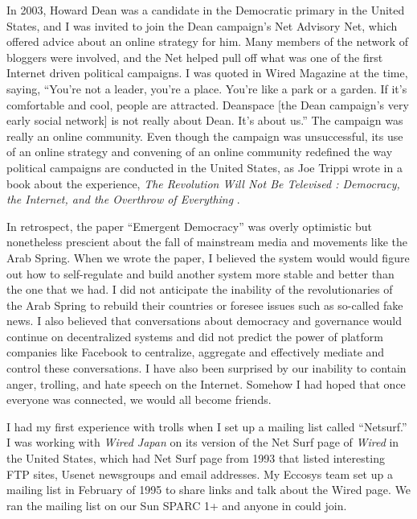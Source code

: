 In 2003, Howard Dean was a candidate in the Democratic primary in the United States, and I was invited to join the Dean campaign's Net Advisory Net, which offered advice about an online strategy for him. Many members of the network of bloggers were involved, and the Net helped pull off what was one of the first Internet driven political campaigns. I was quoted in Wired Magazine \cite{wolf2004internet} at the time, saying, ``You're not a leader, you're a place. You're like a park or a garden. If it's comfortable and cool, people are attracted. Deanspace [the Dean campaign's very early social network] is not really about Dean. It's about us.'' The campaign was really an online community. Even though the campaign was unsuccessful, its use of an online strategy and convening of an online community redefined the way political campaigns are conducted in the United States, as Joe Trippi wrote in a book about the experience, \textit{The Revolution Will Not Be Televised : Democracy, the Internet, and the Overthrow of Everything} \cite{trippi2004revolution}.

In retrospect, the paper ``Emergent Democracy'' was overly optimistic but nonetheless prescient about the fall of mainstream media and movements like the Arab Spring. When we wrote the paper, I believed the system would would figure out how to self-regulate and build another system more stable and better than the one that we had. I did not anticipate the inability of the revolutionaries of the Arab Spring to rebuild their countries or foresee issues such as so-called fake news. I also believed that conversations about democracy and governance would continue on decentralized systems and did not predict the power of platform companies like Facebook to centralize, aggregate and effectively mediate and control these conversations. I have also been surprised by our inability to contain anger, trolling, and hate speech on the Internet. Somehow I had hoped that once everyone was connected, we would all become friends.

I had my first experience with trolls when I set up a mailing list called ``Netsurf.'' I was working with \textit{Wired Japan} on its version of the Net Surf page of \textit{Wired} in the United States, which had Net Surf page from 1993 that listed interesting \ac{FTP} sites, Usenet newsgroups and email addresses. My Eccosys team set up a mailing list in February of 1995 to share links and talk about the Wired page. We ran the mailing list on our Sun SPARC 1+ and anyone in could join.

